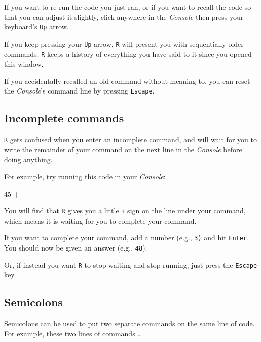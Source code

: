\documentclass[
]{book}
\newenvironment{Shaded}{\begin{snugshade}}{\end{snugshade}}
\newcommand{\DecValTok}[1]{\textcolor[rgb]{0.00,0.00,0.81}{#1}}
\newcommand{\OperatorTok}[1]{\textcolor[rgb]{0.81,0.36,0.00}{\textbf{#1}}}
\begin{document}
If you want to re-run the code you just ran, or if you want to recall the code so that you can adjust it slightly, click anywhere in the \emph{Console} then press your keyboard's \texttt{Up} arrow.

If you keep pressing your \texttt{Up} arrow, \texttt{R} will present you with sequentially older commands. \texttt{R} keeps a history of everything you have said to it since you opened this window.

If you accidentally recalled an old command without meaning to, you can reset the \emph{Console}'s command line by pressing \texttt{Escape}.

\hypertarget{incomplete-commands}{%
\subsection*{Incomplete commands}\label{incomplete-commands}}

\texttt{R} gets confused when you enter an incomplete command, and will wait for you to write the remainder of your command on the next line in the \emph{Console} before doing anything.

For example, try running this code in your \emph{Console}:

\begin{Shaded}
\begin{Highlighting}[]
\DecValTok{45} \OperatorTok{+}
\end{Highlighting}
\end{Shaded}

You will find that \texttt{R} gives you a little \texttt{+} sign on the line under your command, which means it is waiting for you to complete your command.

If you want to complete your command, add a number (e.g., \texttt{3)} and hit \texttt{Enter}. You should now be given an answer (e.g., \texttt{48}).

Or, if instead you want \texttt{R} to stop waiting and stop running, just press the \texttt{Escape} key.

\hypertarget{semicolons}{%
\subsection*{Semicolons}\label{semicolons}}

Semicolons can be used to put two separate commands on the same line of code. For example, these two lines of commands \ldots{}
\end{document}
